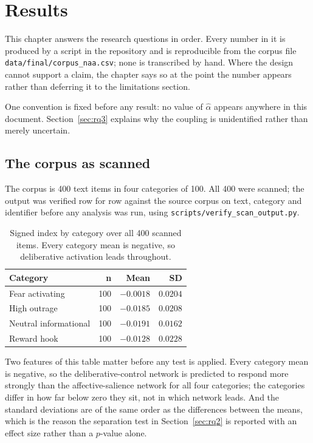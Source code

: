 \chapter{Results}
\label{ch:results}

This chapter answers the research questions in order. Every number in it is produced by a
script in the repository and is reproducible from the corpus file
\texttt{data/final/corpus\_naa.csv}; none is transcribed by hand. Where the design cannot
support a claim, the chapter says so at the point the number appears rather than deferring
it to the limitations section.

One convention is fixed before any result: no value of $\hat{\alpha}$ appears anywhere in
this document. Section~\ref{sec:rq3} explains why the coupling is unidentified rather than
merely uncertain.

\section{The corpus as scanned}

The corpus is 400 text items in four categories of 100. All 400 were scanned; the output was
verified row for row against the source corpus on text, category and identifier before any
analysis was run, using \texttt{scripts/verify\_scan\_output.py}.

\begin{table}[htbp]
\centering
\begin{tabular}{@{}lrrr@{}}
\toprule
\textbf{Category} & \textbf{n} & \textbf{Mean} & \textbf{SD} \\
\midrule
Fear activating        & 100 & $-0.0018$ & $0.0204$ \\
High outrage           & 100 & $-0.0185$ & $0.0208$ \\
Neutral informational  & 100 & $-0.0191$ & $0.0162$ \\
Reward hook            & 100 & $-0.0128$ & $0.0228$ \\
\bottomrule
\end{tabular}
\caption{Signed index by category over all 400 scanned items. Every category mean is negative, so deliberative activation leads throughout.}
\label{tab:category-descriptives}
\end{table}

Two features of this table matter before any test is applied. Every category mean is
negative, so the deliberative-control network is predicted to respond more strongly than the
affective-salience network for all four categories; the categories differ in how far below
zero they sit, not in which network leads. And the standard deviations are of the same order
as the differences between the means, which is the reason the separation test in
Section~\ref{sec:rq2} is reported with an effect size rather than a $p$-value alone.

